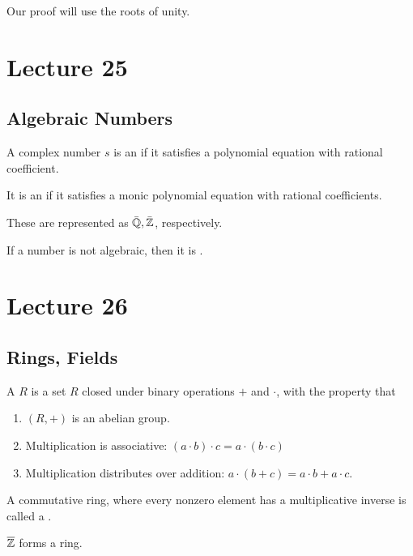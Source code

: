 \documentclass{article}
\begin{document}
Our proof will use the roots of unity. 

\section{Lecture 25} 
\subsection{Algebraic Numbers}
\begin{definition} 
	A complex number $s$ is an  if it satisfies a polynomial equation with rational coefficient. 

	It is an  if it satisfies a monic polynomial equation with rational coefficients.

	These are represented as $\bar{\mathbb Q}, \bar{\mathbb Z}$, respectively.
\end{definition}

If a number is not algebraic, then it is . 
\section{Lecture 26}
\subsection{Rings, Fields}
\begin{definition}[Ring] 
	A  $R$ is a set $R$ closed under binary operations $+$ and $\cdot$, with the property that 
	\begin{enumerate}
		\item $(R, +)$ is an abelian group. 
		\item Multiplication is associative: $(a \cdot b) \cdot c = a \cdot (b \cdot c)$ 
		\item Multiplication distributes over addition: $a \cdot (b + c) = a \cdot b + a \cdot c$.
	\end{enumerate}
\end{definition}

\begin{definition}[Field]
	A commutative ring, where every nonzero element has a multiplicative inverse is called a .
\end{definition}

\begin{proposition}
	$\overline{\mathbb Z}$ forms a ring. 
\end{proposition}
\end{document}
